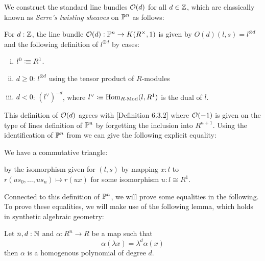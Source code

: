 We construct the standard line bundles $\mathcal{O}(d)$ for all $d\in\mathbb{Z}$,
which are classically known as \emph{Serre's twisting sheaves} on $\mathbb{P}^n$ as follows:

\begin{definition}
  For $d:\mathbb{Z}$, the line bundle $\mathcal{O}(d):\mathbb{P}^n\to K(R^{\times},1)$ is given by $O(d)(l,s) = l^{\otimes d}$
  and the following definition of $l^{\otimes d}$ by cases:
  \begin{enumerate}[(i)]
  \item $l^0\vcentcolon\mspace{-1.2mu}\equiv R^1$.
  \item $d \geqslant 0$: $l^{\otimes d}$ using the tensor product of $R$-modules
  \item $d < 0$: $(l^{\vee})^{-d}$, where $l^{\vee}\vcentcolon\mspace{-1.2mu}\equiv\mathrm{Hom}_{R\text{-}\mathrm{Mod}}(l,R^1)$ is the dual of $l$.
  \end{enumerate}
\end{definition}

This definition of $\mathcal{O}(d)$ agrees with \cite{draft}[Definition 6.3.2] where $\mathcal{O}(-1)$
is given on the type of lines definition of $\mathbb{P}^n$ by forgetting the inclusion into $R^{n+1}$.
Using the identification of $\mathbb{P}^n$ from  we can give the following explicit equality:

\begin{remark}
  We have a commutative triangle:
  \begin{center}
  \end{center}

by the isomorphism given for $(l,s)$ by mapping $x:l$ to $r(u s_0,\dots, u s_n)\mapsto r(u x)$ for some isomorphism $u:l\cong R^1$.
\end{remark}

\medskip

 Connected to this definition of $\mathbb{P}^n$, we will prove some equalities in the following.
 To prove these equalities, we will make use of the following lemma, which holds in synthetic algebraic geometry:
 
\begin{lemma}\label{invariant-implies-homogenous}
  Let $n,d:\mathbb{N}$ and $\alpha:R^n\to R$ be a map such that
  \[\alpha(\lambda x)=\lambda^d\alpha(x)\]
  then $\alpha$ is a homogenous polynomial of degree $d$.
\end{lemma}

